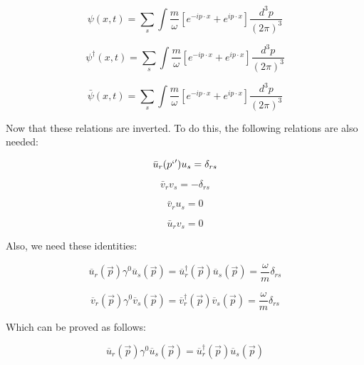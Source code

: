 \documentclass[a4]{article}
\begin{document}
    \begin{equation}
        \psi (x, t) = \sum_{s} \int \frac{m}{\omega} [e^{- i p \cdot x} + e^{i p \cdot x}] \frac{d^{3} p}{(2 \pi)^3}
    \end{equation}

    \begin{equation}
        \psi^{\dagger} (x, t) = \sum_{s} \int \frac{m}{\omega} [e^{- i p \cdot x} + e^{i p \cdot x}] \frac{d^{3} p}{(2 \pi)^3}
    \end{equation}

    \begin{equation}
        \bar{\psi} (x, t) = \sum_{s} \int \frac{m}{\omega} [e^{- i p \cdot x} + e^{i p \cdot x}] \frac{d^{3} p}{(2 \pi)^3}
    \end{equation}

    Now that these relations are inverted. To do this, the following relations are also needed:

    \begin{equation}
        \bar{u}_{r} (p`') u_{s} = \delta_{rs}
    \end{equation}

    \begin{equation}
        \bar{v}_{r} v_{s} = - \delta_{rs}
    \end{equation}

    \begin{equation}
        \bar{v}_{r} u_{s} = 0
    \end{equation}

    \begin{equation}
        \bar{u}_{r} v_{s} = 0
    \end{equation}

    Also, we need these identities:

    \begin{equation}
        \overline{u}_{r} (\vec{p}) \gamma^{0} \overline{u}_{s} (\vec{p}) = \overline{u}_{r}^{\dagger} (\vec{p}) \overline{u}_{s} (\vec{p}) = \frac{\omega}{m} \delta_{rs}
    \end{equation}

    \begin{equation}
        \overline{v}_{r} (\vec{p}) \gamma^{0} \overline{v}_{s} (\vec{p}) = \overline{v}_{r}^{\dagger} (\vec{p}) \overline{v}_{s} (\vec{p}) = \frac{\omega}{m} \delta_{rs}
    \end{equation}

    Which can be proved as follows:

    \begin{equation}
        \overline{u}_{r} (\vec{p}) \gamma^{0} \overline{u}_{s} (\vec{p}) = \overline{u}_{r}^{\dagger} (\vec{p}) \overline{u}_{s} (\vec{p})
    \end{equation}
\end{document}
